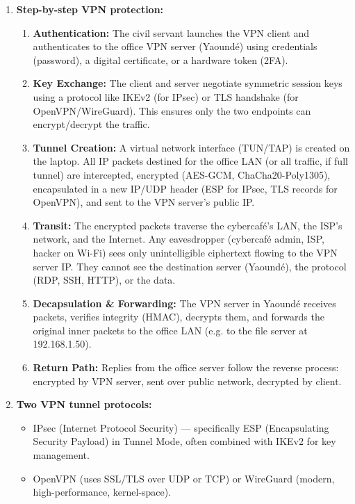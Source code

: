 \documentclass[11pt]{article}
\newcommand{\cle}[1]{{\popxbold\color{popdark}#1}}
\begin{document}
\begin{corrige}
\begin{enumerate}
\item \textbf{Step-by-step VPN protection:}
\begin{enumerate}
\item \textbf{Authentication:} The civil servant launches the VPN client and authenticates to the office VPN server (Yaoundé) using credentials (password), a digital certificate, or a hardware token (2FA).
\item \textbf{Key Exchange:} The client and server negotiate symmetric session keys using a protocol like IKEv2 (for IPsec) or TLS handshake (for OpenVPN/WireGuard). This ensures only the two endpoints can encrypt/decrypt the traffic.
\item \textbf{Tunnel Creation:} A virtual network interface (TUN/TAP) is created on the laptop. All IP packets destined for the office LAN (or all traffic, if full tunnel) are intercepted, encrypted (AES-GCM, ChaCha20-Poly1305), encapsulated in a new IP/UDP header (ESP for IPsec, TLS records for OpenVPN), and sent to the VPN server's public IP.
\item \textbf{Transit:} The encrypted packets traverse the cybercafé's LAN, the ISP's network, and the Internet. Any eavesdropper (cybercafé admin, ISP, hacker on Wi-Fi) sees only unintelligible ciphertext flowing to the VPN server IP. They cannot see the destination server (Yaoundé), the protocol (RDP, SSH, HTTP), or the data.
\item \textbf{Decapsulation \& Forwarding:} The VPN server in Yaoundé receives packets, verifies integrity (HMAC), decrypts them, and forwards the original inner packets to the office LAN (e.g. to the file server at 192.168.1.50).
\item \textbf{Return Path:} Replies from the office server follow the reverse process: encrypted by VPN server, sent over public network, decrypted by client.
\end{enumerate}
\item \textbf{Two VPN tunnel protocols:}
\begin{itemize}
\item \cle{IPsec} (Internet Protocol Security) — specifically ESP (Encapsulating Security Payload) in Tunnel Mode, often combined with IKEv2 for key management.
\item \cle{OpenVPN} (uses SSL/TLS over UDP or TCP) or \cle{WireGuard} (modern, high-performance, kernel-space).
\end{itemize}

\end{enumerate}
\end{corrige}
\end{document}
